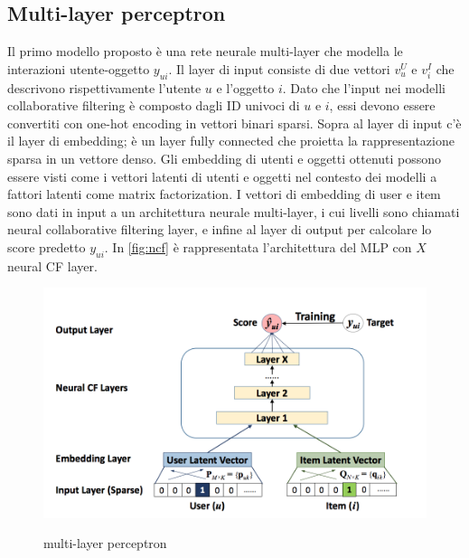 \subsection{Multi-layer perceptron}
Il primo modello proposto è una rete neurale multi-layer che modella le interazioni utente-oggetto $y_{ui}$. Il layer di input consiste di due vettori $v_u^U$ e $v_i^I$ che descrivono rispettivamente l'utente $u$ e l'oggetto $i$. Dato che l'input nei modelli collaborative filtering è composto dagli ID univoci di $u$ e $i$, essi devono essere convertiti con one-hot encoding in vettori binari sparsi.
Sopra al layer di input c'è il layer di embedding; è un layer fully connected che proietta la rappresentazione sparsa in un vettore denso.
Gli embedding di utenti e oggetti ottenuti possono essere visti come i vettori latenti di utenti e oggetti nel contesto dei modelli a fattori latenti come matrix factorization.
I vettori di embedding di user e item sono dati in input a un architettura neurale multi-layer, i cui livelli sono chiamati neural collaborative filtering layer, e infine al layer di output per calcolare lo score predetto $y_{ui}$. In \autoref{fig:ncf} è rappresentata l'architettura del MLP con $X$ neural CF layer.

\begin{figure}
  \centering
  \includegraphics[width=\linewidth]{immagini/ncf.png}
  \caption{multi-layer perceptron}
  \cite{NCF}
  \label{fig:ncf}
\end{figure}


